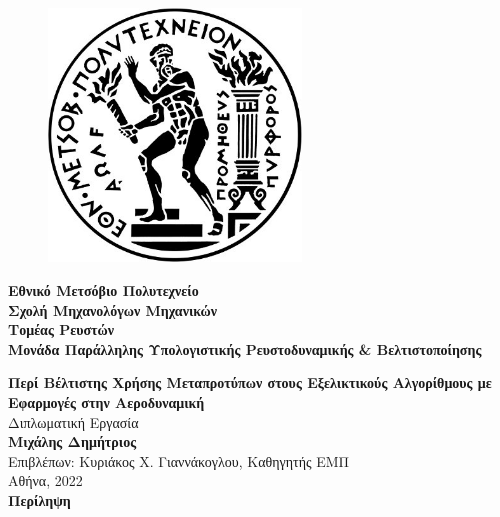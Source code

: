 \documentclass[twoside, 12pt,notitlepage]{report}
\begin{document}
\begin{figure}
\includegraphics[width=0.6\textwidth]{NTUA}
\end{figure}

\hspace{-8mm}
\textbf{Eθνικό Μετσόβιο Πολυτεχνείο} \\
\textbf{Σχολή Μηχανολόγων Μηχανικών} \\
\textbf{Τομέας Ρευστών} \\
\textbf{Μονάδα Παράλληλης Υπολογιστικής Ρευστοδυναμικής \& 
Βελτιστοποίησης} \\

\hspace{-2mm}
\begin{center}
\textbf{Περί Βέλτιστης Χρήσης Μεταπροτύπων στους Εξελικτικούς 
Αλγορίθμους με Εφαρμογές στην Αεροδυναμική} \\[3mm]
Διπλωματική Εργασία \\[1mm]
\textbf{Μιχάλης Δημήτριος} \\[3mm]
Επιβλέπων: Kυριάκος Χ. Γιαννάκογλου, Καθηγητής ΕΜΠ \\[1mm]
Αθήνα, 2022 \\[6mm]
\large \textbf{Περίληψη} \\
\end{center}
\end{document}
